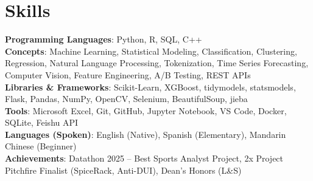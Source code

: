 \documentclass[letterpaper,10pt]{article}
\begin{document}
\section{Skills}
 \begin{itemize}[leftmargin=0.15in, label={}]
    \small{\item{
     \textbf{Programming Languages}{: Python, R, SQL, C++} \\
     \textbf{Concepts}{: Machine Learning, Statistical Modeling, Classification, Clustering, Regression, Natural Language Processing, Tokenization, Time Series Forecasting, Computer Vision, Feature Engineering, A/B Testing, REST APIs} \\
     \textbf{Libraries \& Frameworks}{: Scikit-Learn, XGBoost, tidymodels, statsmodels, Flask, Pandas, NumPy, OpenCV, Selenium, BeautifulSoup, jieba} \\
     \textbf{Tools}{: Microsoft Excel, Git, GitHub, Jupyter Notebook, VS Code, Docker, SQLite, Feishu API} \\
     \textbf{Languages (Spoken)}{: English (Native), Spanish (Elementary), Mandarin Chinese (Beginner)} \\
     \textbf{Achievements}{: Datathon 2025 -- Best Sports Analyst Project, 2x Project Pitchfire Finalist (SpiceRack, Anti-DUI),  Dean's Honors (L&S)}
    }}
 \end{itemize}
 
\end{document}
